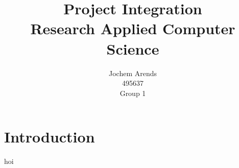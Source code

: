 \documentclass{article}
\title{Project Integration \\ Research Applied Computer Science}
\author{Jochem Arends \\ 495637 \\ Group 1}
\begin{document}
\maketitle
\newpage

\tableofcontents
\newpage

\section{Introduction}

hoi \cite{test}



\end{document}

